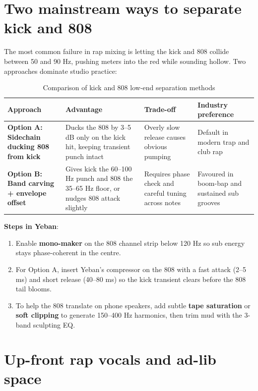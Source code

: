 \section{Two mainstream ways to separate kick and 808}

The most common failure in rap mixing is letting the kick and 808 collide between 50 and 90 Hz, pushing meters into the red while sounding hollow. Two approaches dominate studio practice:

\begin{table}[htbp]
\centering
\begin{tabular}{p{}p{}p{}p{}}
\toprule
Approach & Advantage & Trade-off & Industry preference \\
\midrule
\textbf{Option A: Sidechain ducking 808 from kick} & Ducks the 808 by 3--5 dB only on the kick hit, keeping transient punch intact & Overly slow release causes obvious pumping & Default in modern trap and club rap \\
\textbf{Option B: Band carving + envelope offset} & Gives kick the 60--100 Hz punch and 808 the 35--65 Hz floor, or nudges 808 attack slightly & Requires phase check and careful tuning across notes & Favoured in boom-bap and sustained sub grooves \\
\bottomrule
\end{tabular}
\caption{Comparison of kick and 808 low-end separation methods}
\end{table}

\textbf{Steps in Yeban}:
\begin{enumerate}
  \item Enable \textbf{mono-maker} on the 808 channel strip below 120 Hz so sub energy stays phase-coherent in the centre.
  \item For Option A, insert Yeban's compressor on the 808 with a fast attack (2--5 ms) and short release (40--80 ms) so the kick transient clears before the 808 tail blooms.
  \item To help the 808 translate on phone speakers, add subtle \textbf{tape saturation} or \textbf{soft clipping} to generate 150--400 Hz harmonics, then trim mud with the 3-band sculpting EQ.
\end{enumerate}

\section{Up-front rap vocals and ad-lib space}

